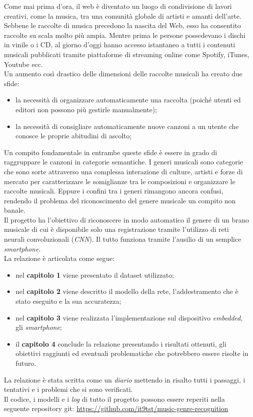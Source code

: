 Come mai prima d'ora, il web è diventato un luogo di condivisione di lavori creativi, come la musica, tra una comunità globale di artisti e amanti dell'arte. Sebbene le raccolte di musica precedono la nascita del Web, esso ha consentito raccolte su scala molto più ampia. Mentre prima le persone possedevano i dischi in vinile o i CD, al giorno d'oggi hanno accesso istantaneo a tutti i contenuti musicali pubblicati tramite piattaforme di streaming online come Spotify, iTunes, Youtube ecc.\\ Un aumento così drastico delle dimensioni delle raccolte musicali ha creato due sfide:
\begin{itemize}
\item la necessità di organizzare automaticamente una raccolta (poiché utenti ed editori non possono più gestirle manualmente);
\item la necessità di consigliare automaticamente nuove canzoni a un utente che conosce le proprie abitudini di ascolto;
\end{itemize}
Un compito fondamentale in entrambe queste sfide è essere in grado di raggruppare le canzoni in categorie semantiche. I generi musicali sono categorie che sono sorte attraverso una complessa interazione di culture, artisti e forze di mercato per caratterizzare le somiglianze tra le composizioni e organizzare le raccolte musicali. Eppure i confini tra i generi rimangono ancora confusi, rendendo il problema del riconoscimento del genere musicale un compito non banale.\\ Il progetto ha l'obiettivo di riconoscere in modo automatico il genere di un brano musicale di cui è disponibile solo una registrazione tramite l'utilizzo di reti neurali convoluzionali (\textit{CNN}). Il tutto funziona tramite l'ausilio di un semplice \textit{smartphone}. \\

La relazione è articolata come segue:
\begin{itemize}
	\item nel \textbf{capitolo 1} viene presentato il dataset utilizzato;
	\item nel \textbf{capitolo 2} viene descritto il modello della rete, l'addestramento che è stato eseguito e la sua accuratezza;
	\item nel \textbf{capitolo 3} viene realizzata l'implementazione sul dispositivo \textit{embedded}, gli \textit{smartphone};
	\item il \textbf{capitolo 4} conclude la relazione presentando i risultati ottenuti, gli obiettivi raggiunti ed eventuali problematiche che potrebbero essere risolte in futuro.
\end{itemize}
La relazione è stata scritta come un \textit{diario} mettendo in risalto tutti i passaggi, i tentativi e i problemi che si sono verificati.\\
\newline
Il codice, i modelli e i \textit{log} di tutto il progetto possono essere reperiti nella seguente repository git: \href{https://github.com/it9tst/music-genre-recognition}{https://github.com/it9tst/music-genre-recognition}